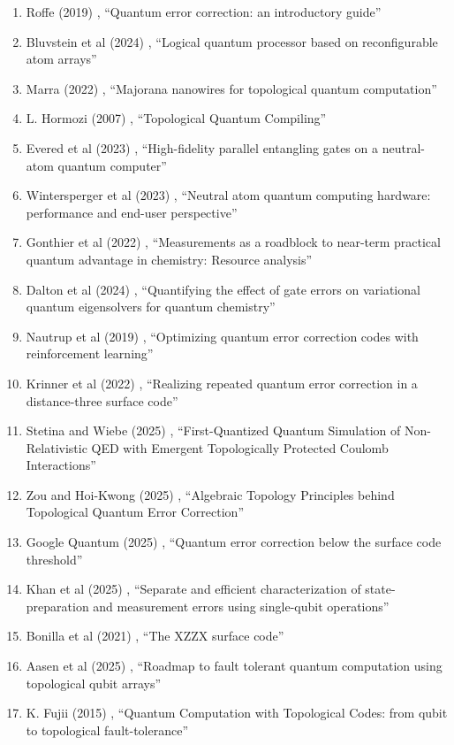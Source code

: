 \documentclass[a4paper,fleqn]{cas-sc}
\begin{document}
\begin{enumerate}
\item Roffe (2019) \cite{roffe2019quantum}, ``Quantum error correction: an introductory guide''
\item Bluvstein et al (2024) \cite{bluvstein2024logical}, ``Logical quantum processor based on reconfigurable atom arrays''
\item Marra (2022) \cite{marra2022majorana}, ``Majorana nanowires for topological quantum computation''
\item L. Hormozi (2007) \cite{L_Hormozi_thesis}, ``Topological Quantum Compiling''
\item Evered et al (2023) \cite{evered2023high}, ``High-fidelity parallel entangling gates on a neutral-atom quantum computer''
\item Wintersperger et al (2023) \cite{wintersperger2023neutral}, ``Neutral atom quantum computing hardware: performance and end-user perspective''
\item Gonthier et al (2022) \cite{gonthier2022measurements}, ``Measurements as a roadblock to near-term practical quantum advantage in chemistry: Resource analysis''
\item Dalton et al (2024) \cite{dalton2024quantifying}, ``Quantifying the effect of gate errors on variational quantum eigensolvers for quantum chemistry''
\item Nautrup et al (2019) \cite{nautrup2019optimizing}, ``Optimizing quantum error correction codes with reinforcement learning''
\item Krinner et al (2022) \cite{krinner2022realizing}, ``Realizing repeated quantum error correction in a distance-three surface code''
\item Stetina and Wiebe (2025) \cite{stetina2025firstquantizedquantumsimulationnonrelativistic}, ``First-Quantized Quantum Simulation of Non-Relativistic QED with Emergent Topologically Protected Coulomb Interactions''
\item Zou and Hoi-Kwong (2025) \cite{zou2025algebraic}, ``Algebraic Topology Principles behind Topological Quantum Error Correction''
\item Google Quantum (2025) \cite{google2025quantum}, ``Quantum error correction below the surface code threshold''
\item Khan et al (2025) \cite{khan2025separate}, ``Separate and efficient characterization of state-preparation and measurement errors using single-qubit operations''
\item Bonilla et al (2021) \cite{bonilla2021xzzx}, ``The XZZX surface code''
\item Aasen et al (2025) \cite{aasen2025roadmapfaulttolerantquantum}, ``Roadmap to fault tolerant quantum computation using topological qubit arrays''
\item K. Fujii (2015) \cite{fujii2015quantumcomputationtopologicalcodes}, ``Quantum Computation with Topological Codes: from qubit to topological fault-tolerance''
\end{enumerate}
\end{document}
